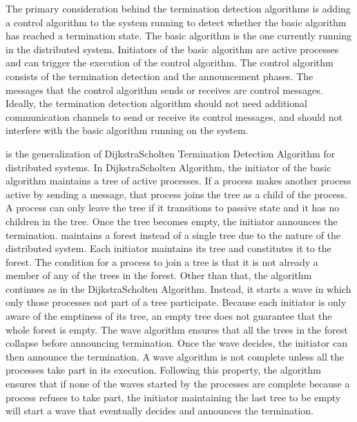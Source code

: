 \documentclass[letterpaper,10pt,english]{sphinxmanual}
\begin{document}
\sphinxAtStartPar
The primary consideration behind the termination detection algorithms is adding a control algorithm to the system running to detect whether the basic algorithm has reached a termination state. The basic algorithm is the one currently running in the distributed system. Initiators of the basic algorithm are active processes and can trigger the execution of the control algorithm. The control algorithm consists of the termination detection and the announcement phases. The messages that the control algorithm sends or receives are control messages. Ideally, the termination detection algorithm should not need additional communication channels to send or receive its control messages, and should not interfere with the basic algorithm running on the system.

\sphinxAtStartPar
{\hyperref[\detokenize{docs/ShavitFrancez/algorithm:shavitfrancezterminationdetectionalgorithm}]{}}  is the generalization of Dijkstra\sphinxhyphen{}Scholten Termination Detection Algorithm  for distributed systems. In Dijkstra\sphinxhyphen{}Scholten Algorithm, the initiator of the basic algorithm maintains a tree of active processes. If a process makes another process active by sending a message, that process joins the tree as a child of the process. A process can only leave the tree if it transitions to passive state and it has no children in the tree. Once the tree becomes empty, the initiator announces the termination. {\hyperref[\detokenize{docs/ShavitFrancez/algorithm:shavitfrancezterminationdetectionalgorithm}]{}}  maintains a forest instead of a single tree due to the nature of the distributed system. Each initiator maintains its tree and constitutes it to the forest. The condition for a process to join a tree is that it is not already a member of any of the trees in the forest. Other than that, the algorithm continues as in the Dijkstra\sphinxhyphen{}Scholten Algorithm. Instead, it starts a wave in which only those processes not part of a tree participate. Because each initiator is only aware of the emptiness of its tree, an empty tree does not guarantee that the whole forest is empty. The wave algorithm ensures that all the trees in the forest collapse before announcing termination. Once the wave decides, the initiator can then announce the termination. A wave algorithm is not complete unless all the processes take part in its execution. Following this property, the algorithm ensures that if none of the waves started by the processes are complete because a process refuses to take part, the initiator maintaining the last tree to be empty will start a wave that eventually decides and announces the termination. 
\end{document}
